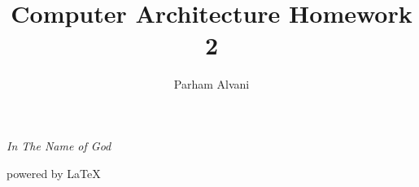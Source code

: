 \documentclass[11pt]{article}
\author{Parham Alvani}
\title{Computer Architecture Homework 2}
\begin{document}
\begin{titlepage}
\begin{center}
\emph{In The Name of God}
\end{center}
\maketitle
\begin{center}
powered by \LaTeX
\end{center}
\end{titlepage}
\tableofcontents
\newpage
\end{document}
